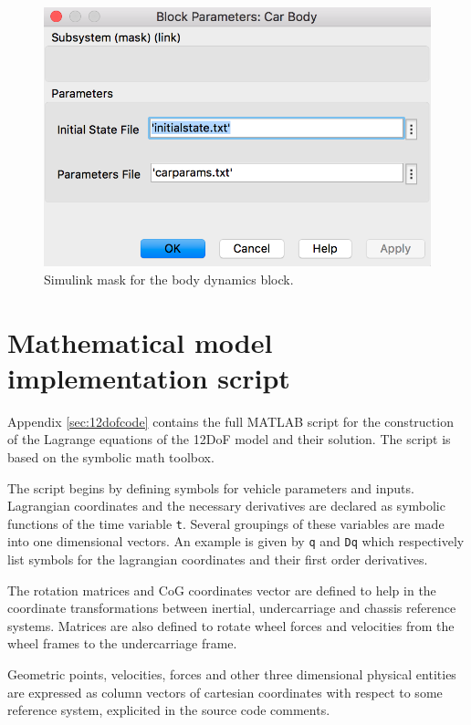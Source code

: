 \begin{figure}[ht]
    \centering
    \includegraphics[scale=0.5]{images/bodymask.png}
    \caption{Simulink mask for the body dynamics block.}
	\label{12mask}
\end{figure}

\section{Mathematical model implementation script}
\label{scriptdescription}

Appendix \ref{sec:12dofcode} contains the full MATLAB script for the construction of the Lagrange equations of the 12DoF model and their solution.
The script is based on the symbolic math toolbox.

The script begins by defining symbols for vehicle parameters and inputs. Lagrangian coordinates and the necessary derivatives are declared as symbolic functions of the time variable \texttt{t}. Several groupings of these variables are made into one dimensional vectors. An example is given by \texttt{q} and \texttt{Dq} which respectively list symbols for the lagrangian coordinates and their first order derivatives.

The rotation matrices and CoG coordinates vector are defined to help in the coordinate transformations between inertial, undercarriage and chassis reference systems.
Matrices are also defined to rotate wheel forces and velocities from the wheel frames to the undercarriage frame.

Geometric points, velocities, forces and other three dimensional physical entities are expressed as column vectors of cartesian coordinates with respect to some reference system, explicited in the source code comments.

